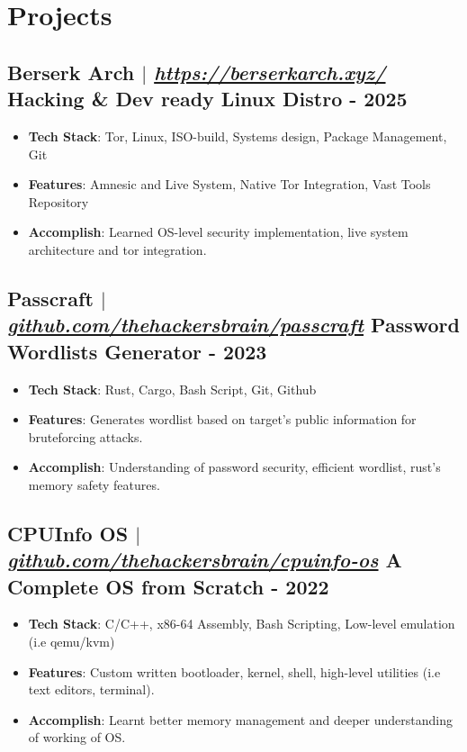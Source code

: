\documentclass[11pt]{article} %
\begin{document}
\section{Projects}
\subsection{Berserk Arch $|$ \normalfont\textit{\href{https://berserkarch.xyz/}{https://berserkarch.xyz/}} \hfill Hacking \& Dev ready Linux Distro - \textbf{2025}}
\vspace{3pt}
\begin{itemize}
  \item \textbf{Tech Stack}: Tor, Linux, ISO-build, Systems design, Package Management, Git
  \item \textbf{Features}: Amnesic and Live System, Native Tor Integration, Vast Tools Repository
  \item \textbf{Accomplish}: Learned OS-level security implementation, live system architecture and tor integration.
\end{itemize}

\subsection{Passcraft $|$ \normalfont\textit{\href{https://github.com/thehackersbrain/passcraft}{github.com/thehackersbrain/passcraft}} \hfill Password Wordlists Generator - \textbf{2023}}
\vspace{3pt}
\begin{itemize}
  \item \textbf{Tech Stack}: Rust, Cargo, Bash Script, Git, Github
  \item \textbf{Features}: Generates wordlist based on target's public information for bruteforcing attacks.
  \item \textbf{Accomplish}: Understanding of password security, efficient wordlist, rust's memory safety features.
\end{itemize}

\subsection{CPUInfo OS $|$ \normalfont\textit{\href{https://github.com/thehackersbrain/cpuinfo-os}{github.com/thehackersbrain/cpuinfo-os}} \hfill A Complete OS from Scratch - \textbf{2022}}
\vspace{3pt}
\begin{itemize}
  \item \textbf{Tech Stack}: C/C++, x86-64 Assembly, Bash Scripting, Low-level emulation (i.e qemu/kvm)
  \item \textbf{Features}: Custom written bootloader, kernel, shell, high-level utilities (i.e text editors, terminal).
  \item \textbf{Accomplish}: Learnt better memory management and deeper understanding of working of OS.
\end{itemize}
\end{document}
